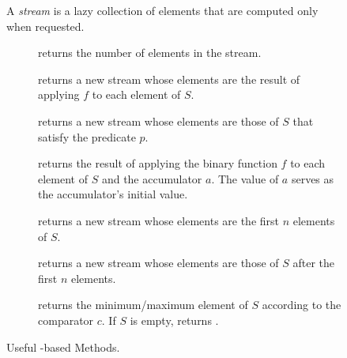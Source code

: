 \begin{figure}[tp]
  \small
  \begin{tcolorbox}[title=Java Streams]
    A \textit{stream} is a lazy collection of elements that are computed only when requested.
    \vspace{2ex}
  \begin{description}
    \item [] returns the number of elements in the stream.
    \item [] returns a new stream whose elements are the result of applying $f$ to each element of $S$.
    \item [] returns a new stream whose elements are those of $S$ that satisfy the predicate $p$.
    \item [] returns the result of applying the binary function $f$ to each element of $S$ and the accumulator $a$. The value of $a$ serves as the accumulator's initial value.
    \item [] returns a new stream whose elements are the first $n$ elements of $S$.
    \item [] returns a new stream whose elements are those of $S$ after the first $n$ elements.
    \item [] returns the minimum/maximum element of $S$ according to the comparator $c$. If $S$ is empty, returns .
  \end{description}
\end{tcolorbox}
  \caption{Useful -based Methods.}
  \label{fig:streams}
\end{figure}


